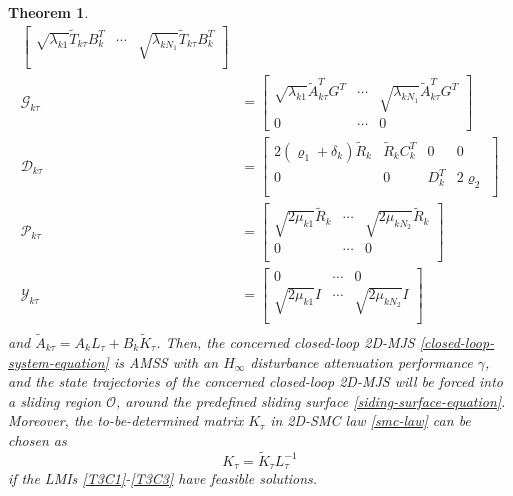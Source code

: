 \documentclass[journal,final,twocolumn]{IEEEtran}
\newtheorem{theorem}{Theorem}
\begin{document}
\begin{theorem}
\begin{equation}
\begin{split}
\begin{bmatrix}
				\sqrt{\lambda_{k1}}\tilde{T}_{k\tau }B^{T}_{k} &\cdots&\sqrt{\lambda_{kN_{1}}} \tilde{T}_{k\tau }B^{T}_{k}\\
			\end{bmatrix} \\
			\mathscr{G}_{k\tau } &=\begin{bmatrix}
				\sqrt{\lambda_{k1}} \tilde{A}^{T}_{k\tau }G^{T}& \cdots&\sqrt{\lambda_{kN_{1}}} \tilde{A}^{T}_{k\tau }G^{T}\\
				0  &\cdots& 0
			\end{bmatrix}\\
			\mathscr{D}_{k\tau } &= \begin{bmatrix}
				2(\varrho_{1}+ \delta_{k} )\tilde{R}_{k}& \tilde{R}_{k}C^{T}_{k}&0&0\\
				0&0&D^{T}_{k}&2\varrho_{2} \\
			\end{bmatrix} \\	
			\mathscr{P}_{k\tau } &= \begin{bmatrix}
				\sqrt{2\mu_{k1}} \tilde{R}_{k} &\cdots &\sqrt{2\mu_{kN_{2}}} \tilde{R}_{k}\\
				0 & \cdots & 0\\
			\end{bmatrix}	\\
			\mathscr{Y}_{k\tau } &= \begin{bmatrix}
				0 & \cdots & 0\\
				\sqrt{2\mu_{k1}} I &\cdots &\sqrt{2\mu_{kN_{2}}} I\\
			\end{bmatrix}	\\						
		\end{split}
	\end{equation}
	and $\tilde{A}_{k\tau } =  A_{k}L_{\tau } + B_{k}\tilde{K}_{\tau }$. Then,  the concerned closed-loop 2D-MJS \eqref{closed-loop-system-equation} is AMSS with an $H_{\infty}$ disturbance attenuation  performance $\gamma$, and the state trajectories of the concerned closed-loop 2D-MJS will be forced into a sliding region $\mathcal{O}$, around the predefined sliding surface \eqref{siding-surface-equation}. Moreover, the to-be-determined matrix $K_{\tau }$ in 2D-SMC law \eqref{smc-law} can be chosen as 
	\begin{equation}
		K_{\tau } = \tilde{K}_{\tau }L^{-1}_{\tau }
	\end{equation}
	if the LMIs \eqref{T3C1}-\eqref{T3C3} have feasible solutions.
\end{theorem}
\end{document}
